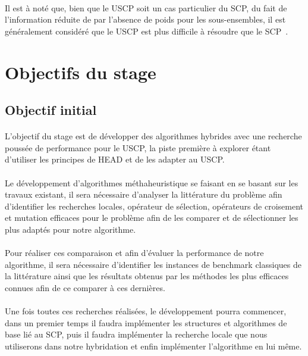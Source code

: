 \documentclass[a4paper,11pt,twoside,french,report]{../common/simplem}
\begin{document}
				\paragraph*{}
					Il est à noté que, bien que le \gls{USCP} soit un cas particulier du \gls{SCP}, du fait de l'information réduite de par l'absence de poids pour les sous-ensembles, il est généralement considéré que le \gls{USCP} est plus difficile à résoudre que le \gls{SCP}~\cite{Yelbay2015}.
		\section{Objectifs du stage}
			\subsection{Objectif initial}
				\paragraph*{}
					L'objectif du stage est de développer des algorithmes hybrides avec une recherche poussée de performance pour le \gls{USCP}, la piste première à explorer étant d'utiliser les principes de \gls{HEAD} et de les adapter au \gls{USCP}.
				\paragraph*{}
					Le développement d'algorithmes méthaheuristique se faisant en se basant sur les travaux existant, il sera nécessaire d'analyser la littérature du problème afin d'identifier les recherches locales, opérateur de sélection, opérateurs de croisement et mutation efficaces pour le problème afin de les comparer et de sélectionner les plus adaptés pour notre algorithme.
				\paragraph*{}
					Pour réaliser ces comparaison et afin d'évaluer la performance de notre algorithme, il sera nécessaire d'identifier les instances de benchmark classiques de la littérature ainsi que les résultats obtenus par les méthodes les plus efficaces connues afin de ce comparer à ces dernières.
				\paragraph*{}
					Une fois toutes ces recherches réalisées, le développement pourra commencer, dans un premier temps il faudra implémenter les structures et algorithmes de base lié au \gls{SCP}, puis il faudra implémenter la recherche locale que nous utiliserons dans notre hybridation et enfin implémenter l'algorithme en lui même.
\end{document}
